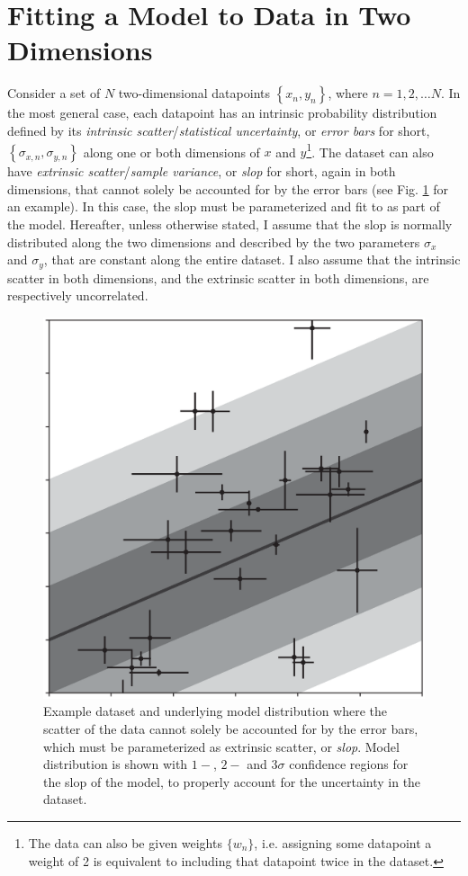 \section{Fitting a Model to Data in Two Dimensions}
\label{sec:2dmodelfitting}
Consider a set of $N$ two-dimensional datapoints $\left\{x_n, y_n\right\}$, where $n = 1, 2, \ldots N$. In the most general case, each datapoint has an intrinsic probability distribution defined by its \textit{intrinsic scatter}/\textit{statistical uncertainty}, or \textit{error bars} for short, $\left\{\sigma_{x,n}, \sigma_{y,n}\right\}$ along one or both dimensions of $x$ and $y$\footnote{The data can also be given weights $\{w_n\}$, i.e. assigning some datapoint a weight of 2 is equivalent to including that datapoint twice in the dataset.}. The dataset can also have \textit{extrinsic scatter}/\textit{sample variance}, or \textit{slop} for short, again in both dimensions, that cannot solely be accounted for by the error bars (see Fig. \ref{fig:slopexample} for an example). In this case, the slop must be parameterized and fit to as part of the model. Hereafter, unless otherwise stated, I assume that the slop is normally distributed along the two dimensions and described by the two parameters $\sigma_x$ and $\sigma_y$, that are constant along the entire dataset. I also assume that the intrinsic scatter in both dimensions, and the extrinsic scatter in both dimensions, are respectively uncorrelated.

\begin{figure}
    \centering
    \includegraphics[width=0.8\linewidth]{figures/slopexample.eps}
    \caption{Example dataset and underlying model distribution where the scatter of the data cannot solely be accounted for by the error bars, which must be parameterized as extrinsic scatter, or \textit{slop}. Model distribution is shown with $1-$, $2-$ and $3\sigma$ confidence regions for the slop of the model, to properly account for the uncertainty in the dataset.}
    \label{fig:slopexample}
\end{figure}

